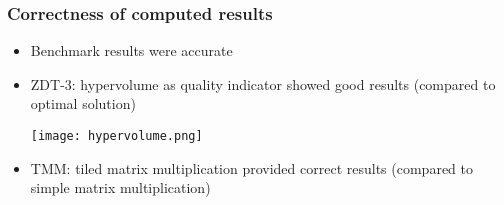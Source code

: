 % 

\begin{frame}
  \frametitle{Correctness of computed results}
  \begin{itemize}
    \item Benchmark results were accurate
    \item ZDT-3: hypervolume as quality indicator showed good results (compared to optimal solution)
    \begin{center}
    \texttt{[image: hypervolume.png]}
  \end{center}
    \item TMM: tiled matrix multiplication provided correct results (compared to simple matrix multiplication)
  \end{itemize}
  
\end{frame}

